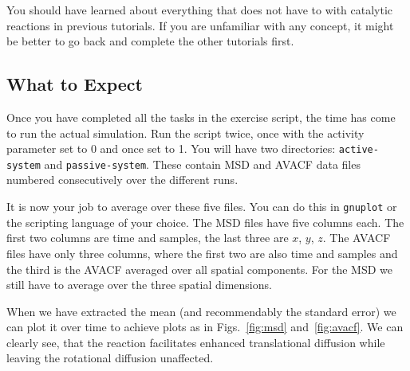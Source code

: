 \documentclass[aip,jcp,reprint,a4paper,onecolumn,nofootinbib,amsmath,amssymb]{revtex4-1}
\newcommand\code{\lstinline}
\begin{document}
You should have learned about everything that does not have to with catalytic reactions in previous tutorials. If you are unfamiliar with any concept, it might be better to go back and complete the other tutorials first.

\subsection{What to Expect}

Once you have completed all the tasks in the exercise script, the time has come to run the actual simulation. Run the script twice, once with the activity parameter set to 0 and once set to 1. You will have two directories: \code{active-system} and \code{passive-system}. These contain MSD and AVACF data files numbered consecutively over the
different runs.

It is now your job to average over these five files. You can do this in \code{gnuplot} or the scripting language of your choice. The MSD files have five columns each. The first two columns are time and samples, the last three are $x$, $y$, $z$. The AVACF files have only three columns, where the first two are also time and samples and the
third is the AVACF averaged over all spatial components. For the MSD we still have to average over the three spatial dimensions.

When we have extracted the mean (and recommendably the standard error) we can plot it over time to achieve plots as in Figs.~\ref{fig:msd} and~\ref{fig:avacf}. We can clearly see, that the reaction facilitates enhanced translational diffusion while
leaving the rotational diffusion unaffected.
\end{document}
